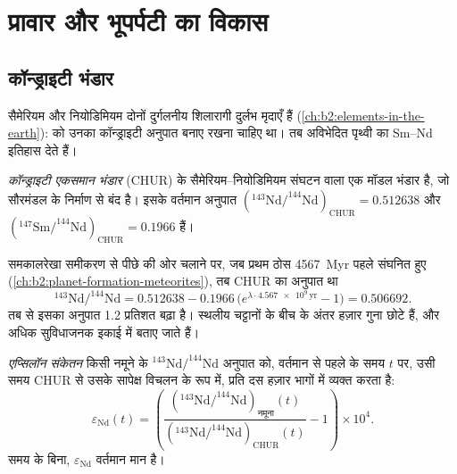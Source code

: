 \section{प्रावार और भूपर्पटी का विकास}

\subsection{कॉन्ड्राइटी भंडार}

सैमेरियम और नियोडिमियम दोनों दुर्गलनीय शिलारागी दुर्लभ मृदाएँ हैं
(\cref{ch:b2:elements-in-the-earth}):  को उनका
कॉन्ड्राइटी अनुपात बनाए रखना चाहिए था। तब 
अविभेदित पृथ्वी का Sm--Nd इतिहास देते हैं।

\begin{definition}[कॉन्ड्राइटी एकसमान भंडार]\label{def:b2:isotope-geochemistry:chur}
\emph{कॉन्ड्राइटी एकसमान भंडार}
(CHUR)  के सैमेरियम--नियोडिमियम संघटन वाला एक मॉडल भंडार है,
जो सौरमंडल के निर्माण से बंद है। इसके वर्तमान
अनुपात $(^{143}\mathrm{Nd}/^{144}\mathrm{Nd})_{\mathrm{CHUR}} = 0.512638$ और
$(^{147}\mathrm{Sm}/^{144}\mathrm{Nd})_{\mathrm{CHUR}} = 0.1966$ हैं।
\end{definition}

समकालरेखा समीकरण से पीछे की ओर चलाने पर, जब प्रथम ठोस
\qty{4567}{Myr} पहले संघनित हुए (\cref{ch:b2:planet-formation-meteorites}), तब CHUR का अनुपात था
\[
  ^{143}\mathrm{Nd}/^{144}\mathrm{Nd} = 0.512638 - 0.1966\,\bigl(e^{\lambda\cdot
  \num{4.567e9}\,\mathrm{yr}}-1\bigr) = 0.506692 .
\] तब से इसका अनुपात
1.2 प्रतिशत बढ़ा है। स्थलीय चट्टानों के बीच के अंतर हज़ार गुना
छोटे हैं, और अधिक सुविधाजनक इकाई में बताए जाते हैं।

\begin{definition}[एप्सिलॉन संकेतन]\label{def:b2:isotope-geochemistry:epsilon}
\emph{एप्सिलॉन संकेतन} किसी नमूने के
$^{143}\mathrm{Nd}/^{144}\mathrm{Nd}$ अनुपात को, वर्तमान से पहले के समय $t$ पर,
उसी समय CHUR से उसके सापेक्ष विचलन के रूप में, प्रति दस
हज़ार भागों में व्यक्त करता है:
\[
  \varepsilon_{\mathrm{Nd}}(t) = \left(
  \frac{(^{143}\mathrm{Nd}/^{144}\mathrm{Nd})_{\text{नमूना}}(t)}
       {(^{143}\mathrm{Nd}/^{144}\mathrm{Nd})_{\mathrm{CHUR}}(t)} - 1\right)\times 10^4 .
\]
समय के बिना, $\varepsilon_{\mathrm{Nd}}$ वर्तमान मान है।
\end{definition}

